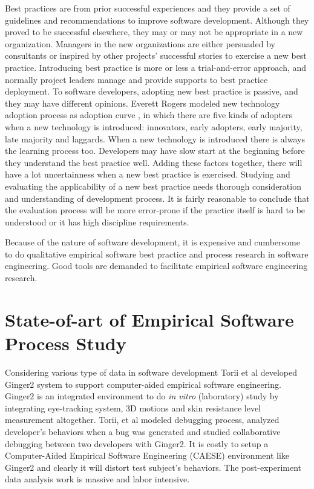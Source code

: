 Best practices are from prior successful experiences and they provide a set
of guidelines and recommendations to improve software development. Although
they proved to be successful elsewhere, they may or may not be appropriate
in a new organization. Managers in the new organizations are either
persuaded by consultants or inspired by other projects' successful stories
to exercise a new best practice. Introducing best practice is more or less
a trial-and-error approach, and normally project leaders manage and provide
supports to best practice deployment. To software developers, adopting new
best practice is passive, and they may have different opinions. Everett
Rogers modeled new technology adoption process as adoption curve
\cite{Potter:02}, in which there are five kinds of adopters when a new
technology is introduced: innovators, early adopters, early majority, late
majority and laggards.  When a new technology is introduced there is always
the learning process too.  Developers may have slow start at the beginning
before they understand the best practice well. Adding these factors
together, there will have a lot uncertainness when a new best practice is
exercised. Studying and evaluating the applicability of a new best practice
needs thorough consideration and understanding of development process. It
is fairly reasonable to conclude that the evaluation process will be more
error-prone if the practice itself is hard to be understood or it has high
discipline requirements.

Because of the nature of software development, it is expensive and
cumbersome to do qualitative empirical software best practice and process
research in software engineering. Good tools are demanded to facilitate
empirical software engineering research.

\section{State-of-art of Empirical Software Process Study}
Considering various type of data in software development Torii et al
developed Ginger2 \cite{Ginger2} system to support computer-aided empirical
software engineering. Ginger2 is an integrated environment to do \textit{in vitro} 
(laboratory) study by integrating eye-tracking system, 3D motions
and skin resistance level measurement altogether. Torii, et al 
modeled debugging process, analyzed developer's behaviors when a bug was
generated and studied collaborative debugging between two developers with 
Ginger2. It is costly to setup a Computer-Aided Empirical Software Engineering 
(CAESE) environment like Ginger2 and clearly it will distort test subject's
behaviors. The post-experiment data analysis work is massive and labor
intensive.

